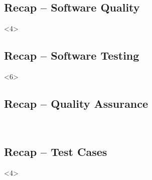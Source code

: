 \subsection{Recap -- Software Quality}
\begin{frame}<4>{\insertsubsection}
	\slideSoftwareQuality
\end{frame}

\subsection{Recap -- Software Testing}
\begin{frame}<6>{\insertsubsection}
	\slideSoftwareTesting
\end{frame}

\subsection{Recap -- Quality Assurance}
\begin{frame}{\insertsubsection\ \mytitlesource{\ludewiglichter}}
	\slideMindmapQualityAssuranceMod{}{}{}{}{}{}{}
\end{frame}

\subsection{Recap -- Test Cases}
\begin{frame}<4>{\insertsubsection}
	\begin{fancycolumns}[animation=none]
		\explTestCases
		\nextcolumn
		\figTestDesign
	\end{fancycolumns}
	
\end{frame}

